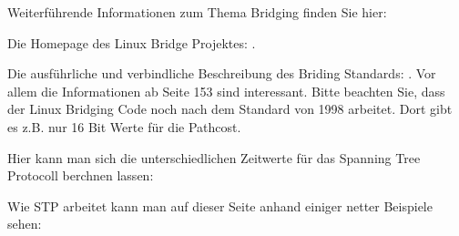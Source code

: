 Weiterführende Informationen zum Thema Bridging finden Sie hier:

Die Homepage des Linux Bridge Projektes:
.

Die ausführliche und verbindliche Beschreibung des Briding Standards:
. Vor
allem die Informationen ab Seite 153 sind interessant. Bitte beachten
Sie, dass der Linux Bridging Code noch nach dem Standard von 1998
arbeitet. Dort gibt es z.B. nur 16 Bit Werte für die Pathcost.

Hier kann man sich die unterschiedlichen Zeitwerte für das Spanning
Tree Protocoll berchnen lassen:

Wie STP arbeitet kann man auf dieser Seite anhand einiger netter
Beispiele sehen:

